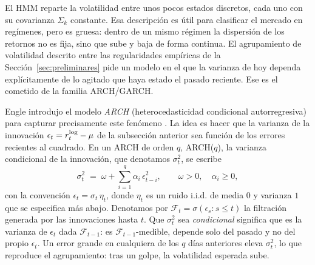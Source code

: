 El HMM reparte la volatilidad entre unos pocos estados discretos, cada uno con su covarianza $\Sigma_k$ constante. Esa descripción es útil para clasificar el mercado en regímenes, pero es gruesa: dentro de un mismo régimen la dispersión de los retornos no es fija, sino que sube y baja de forma continua. El agrupamiento de volatilidad descrito entre las regularidades empíricas de la Sección~\ref{sec:preliminares} pide un modelo en el que la varianza de hoy dependa explícitamente de lo agitado que haya estado el pasado reciente. Ese es el cometido de la familia ARCH/GARCH.

Engle introdujo el modelo \emph{ARCH} (heterocedasticidad condicional autorregresiva) para capturar precisamente este fenómeno \cite{engle1982}. La idea es hacer que la varianza de la innovación $\epsilon_t = r_t^{\log} - \mu$ de la subsección anterior sea función de los errores recientes al cuadrado. En un ARCH de orden $q$, ARCH($q$), la varianza condicional de la innovación, que denotamos $\sigma_t^2$, se escribe
\[
\sigma_t^2 \;=\; \omega + \sum_{i=1}^{q} \alpha_i\, \epsilon_{t-i}^2,
\qquad \omega > 0, \quad \alpha_i \ge 0,
\]
con la convención $\epsilon_t = \sigma_t\, \eta_t$, donde $\eta_t$ es un ruido i.i.d. de media $0$ y varianza $1$ que se especifica más abajo. Denotamos por $\mathcal{F}_t = \sigma(\epsilon_s : s \le t)$ la filtración generada por las innovaciones hasta $t$. Que $\sigma_t^2$ sea \emph{condicional} significa que es la varianza de $\epsilon_t$ dada $\mathcal{F}_{t-1}$: es $\mathcal{F}_{t-1}$-medible, depende solo del pasado y no del propio $\epsilon_t$. Un error grande en cualquiera de los $q$ días anteriores eleva $\sigma_t^2$, lo que reproduce el agrupamiento: tras un golpe, la volatilidad esperada sube.

